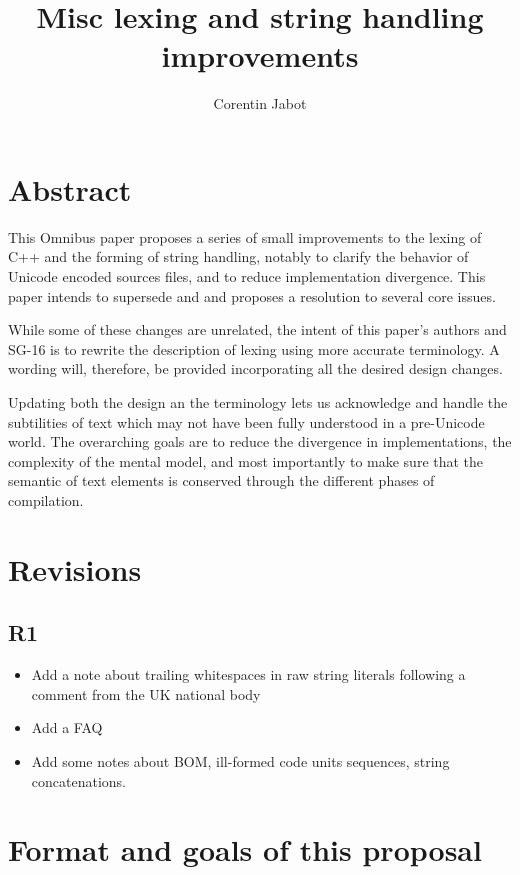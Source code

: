 \documentclass{wg21}
\title{Misc lexing and string handling improvements}
\author{Corentin Jabot}{corentin.jabot@gmail.com}
\begin{document}
\maketitle

\paperquote{}

\section{Abstract}

This Omnibus paper proposes a series of small improvements to the lexing of C++ and the forming of string handling,
notably to clarify the behavior of Unicode encoded sources files, and to reduce implementation divergence.
This paper intends to supersede  and  and proposes a resolution to several core issues.

While some of these changes are unrelated, the intent of this paper's authors and SG-16 is to rewrite the description of lexing
using more accurate terminology. A wording will, therefore, be provided incorporating all the desired design changes.

Updating both the design an the terminology lets us acknowledge and handle the subtilities of text which may not have been fully understood
in a pre-Unicode world.
The overarching goals are to reduce the divergence in implementations, the complexity of the mental model, and most importantly to make sure that
the semantic of text elements is conserved through the different phases of compilation.

\section{Revisions}

\subsection{R1}
\begin{itemize}
\item Add a note about trailing whitespaces in raw string literals following a comment from the UK national body 
\item Add a FAQ
\item Add some notes about BOM, ill-formed code units sequences, string concatenations.
\end{itemize}


\section{Format and goals of this proposal}
\end{document}
